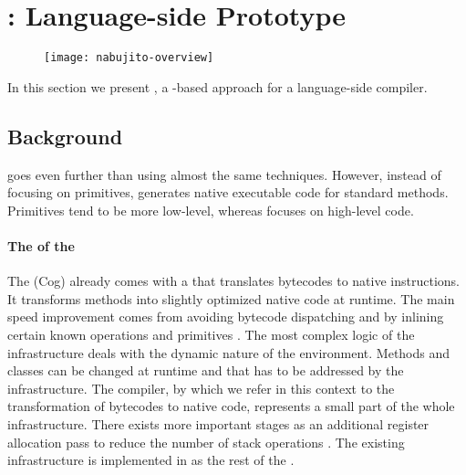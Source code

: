 
\newpage
\section{\NBJ: Language-side \JIT Prototype}

\begin{figure}[h]
	\centering
	\texttt{[image: nabujito-overview]}
\end{figure}

\noindent In this section we present \NBJ, a \B-based approach for a language-side \JIT compiler.

\subsection{Background}

\NBJ goes even further than \WF using almost the same techniques.
However, instead of focusing on primitives, \NBJ generates native executable code for standard \ST methods.
Primitives tend to be more low-level, whereas \NBJ focuses on high-level \ST code. 


\paragraph{The \JIT of the \PH \VM}
The \PH \VM (Cog) already comes with a \JIT that translates bytecodes to native instructions.
It transforms \ST methods into slightly optimized native code at runtime.
The main speed improvement comes from avoiding bytecode dispatching and by inlining certain known operations and primitives \cite{Ayco03a}.
The most complex logic of the \JIT infrastructure deals with the dynamic nature of the \ST environment.
Methods and classes can be changed at runtime and that has to be addressed by the \JIT infrastructure.
The \JIT compiler, by which we refer in this context to the transformation of bytecodes to native code, represents a small part of the whole infrastructure.
There exists more important stages as an additional register allocation pass to reduce the number of stack operations \cite{Mira99a,Mira11a}.
The existing \JIT infrastructure is implemented in \Slang \cite[Ch.\ 5]{Blac09a} as the rest of the \VM.

